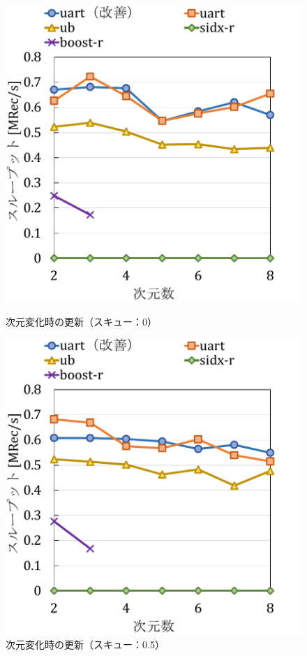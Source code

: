 \begin{figure}[tb]
  \begin{minipage}[c]{0.495\textwidth}
    \centering
    \includegraphics[scale=0.45]{./figures/graph-dimention-update-0.pdf}
    \caption{次元変化時の更新（スキュー：0）}
    \label{graph:grouped}
  \end{minipage}
  \begin{minipage}[c]{0.495\textwidth}
    \centering
    \includegraphics[scale=0.45]{./figures/graph-dimention-update-0.5.pdf}
    \caption{次元変化時の更新（スキュー：0.5）}
    \label{graph:paired}
  \end{minipage}
\end{figure}

